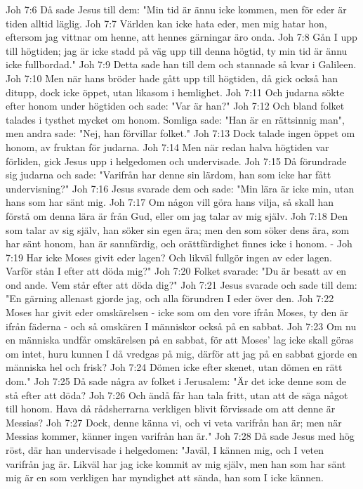 Joh 7:6  Då sade Jesus till dem: "Min tid är ännu icke kommen, men för eder är tiden alltid läglig.
Joh 7:7  Världen kan icke hata eder, men mig hatar hon, eftersom jag vittnar om henne, att hennes gärningar äro onda.
Joh 7:8  Gån I upp till högtiden; jag är icke stadd på väg upp till denna högtid, ty min tid är ännu icke fullbordad."
Joh 7:9  Detta sade han till dem och stannade så kvar i Galileen.
Joh 7:10  Men när hans bröder hade gått upp till högtiden, då gick också han ditupp, dock icke öppet, utan likasom i hemlighet.
Joh 7:11  Och judarna sökte efter honom under högtiden och sade: "Var är han?"
Joh 7:12  Och bland folket talades i tysthet mycket om honom. Somliga sade: "Han är en rättsinnig man", men andra sade: "Nej, han förvillar folket."
Joh 7:13  Dock talade ingen öppet om honom, av fruktan för judarna.
Joh 7:14  Men när redan halva högtiden var förliden, gick Jesus upp i helgedomen och undervisade.
Joh 7:15  Då förundrade sig judarna och sade: "Varifrån har denne sin lärdom, han som icke har fått undervisning?"
Joh 7:16  Jesus svarade dem och sade: "Min lära är icke min, utan hans som har sänt mig.
Joh 7:17  Om någon vill göra hans vilja, så skall han förstå om denna lära är från Gud, eller om jag talar av mig själv.
Joh 7:18  Den som talar av sig själv, han söker sin egen ära; men den som söker dens ära, som har sänt honom, han är sannfärdig, och orättfärdighet finnes icke i honom. -
Joh 7:19  Har icke Moses givit eder lagen? Och likväl fullgör ingen av eder lagen. Varför stån I efter att döda mig?"
Joh 7:20  Folket svarade: "Du är besatt av en ond ande. Vem står efter att döda dig?"
Joh 7:21  Jesus svarade och sade till dem: "En gärning allenast gjorde jag, och alla förundren I eder över den.
Joh 7:22  Moses har givit eder omskärelsen - icke som om den vore ifrån Moses, ty den är ifrån fäderna - och så omskären I människor också på en sabbat.
Joh 7:23  Om nu en människa undfår omskärelsen på en sabbat, för att Moses' lag icke skall göras om intet, huru kunnen I då vredgas på mig, därför att jag på en sabbat gjorde en människa hel och frisk?
Joh 7:24  Dömen icke efter skenet, utan dömen en rätt dom."
Joh 7:25  Då sade några av folket i Jerusalem: "Är det icke denne som de stå efter att döda?
Joh 7:26  Och ändå får han tala fritt, utan att de säga något till honom. Hava då rådsherrarna verkligen blivit förvissade om att denne är Messias?
Joh 7:27  Dock, denne känna vi, och vi veta varifrån han är; men när Messias kommer, känner ingen varifrån han är."
Joh 7:28  Då sade Jesus med hög röst, där han undervisade i helgedomen: "Javäl, I kännen mig, och I veten varifrån jag är. Likväl har jag icke kommit av mig själv, men han som har sänt mig är en som verkligen har myndighet att sända, han som I icke kännen.
